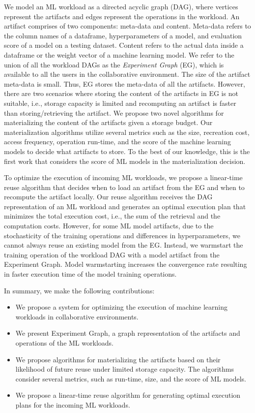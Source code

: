 We model an ML workload as a directed acyclic graph (DAG), where vertices represent the artifacts and edges represent the operations in the workload.
An artifact comprises of two components: meta-data and content.
Meta-data refers to the column names of a dataframe, hyperparameters of a model, and evaluation score of a model on a testing dataset.
Content refers to the actual data inside a dataframe or the weight vector of a machine learning model.
We refer to the union of all the workload DAGs as the \textit{Experiment Graph} (EG), which is available to all the users in the collaborative environment.
The size of the artifact meta-data is small.
Thus, EG stores the meta-data of all the artifacts.
However, there are two scenarios where storing the content of the artifacts in EG is not suitable, i.e., storage capacity is limited and recomputing an artifact is faster than storing/retrieving the artifact.
We propose two novel algorithms for materializing the content of the artifacts given a storage budget.
Our materialization algorithms utilize several metrics such as the size, recreation cost, access frequency, operation run-time, and the score of the machine learning models to decide what artifacts to store.
To the best of our knowledge, this is the first work that considers the score of ML models in the materialization decision.

To optimize the execution of incoming ML workloads, we propose a linear-time reuse algorithm that decides when to load an artifact from the EG and when to recompute the artifact locally.
Our reuse algorithm receives the DAG representation of an ML workload and generates an optimal execution plan that minimizes the total execution cost, i.e., the sum of the retrieval and the computation costs.
However, for some ML model artifacts, due to the stochasticity of the training operations and differences in hyperparameters, we cannot always reuse an existing model from the EG.
Instead, we warmstart the training operation of the workload DAG with a model artifact from the Experiment Graph.
Model warmstarting increases the convergence rate resulting in faster execution time of the model training operations.

In summary, we make the following contributions:
\begin{itemize}
\item We propose a system for optimizing the execution of machine learning workloads in collaborative environments.
\item We present Experiment Graph, a graph representation of the artifacts and operations of the ML workloads.
\item We propose algorithms for materializing the artifacts based on their likelihood of future reuse under limited storage capacity. The algorithms consider several metrics, such as run-time, size, and the score of ML models.
\item We propose a linear-time reuse algorithm for generating optimal execution plans for the incoming ML workloads.
\end{itemize}

